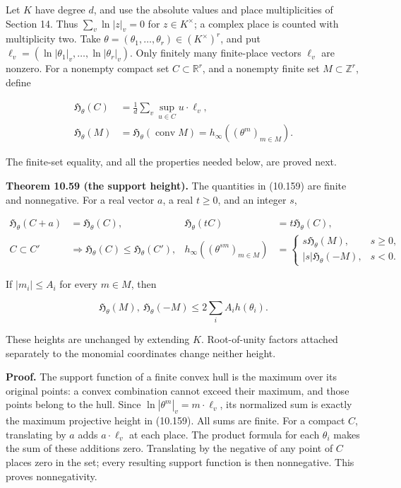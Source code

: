 \documentclass[
  11pt,
  a4paper,
]{article}
\newcounter{none} %
\begin{document}
Let \(K\) have degree \(d\), and use the absolute values and place
multiplicities of Section 14. Thus \(\sum_v\ln|z|_v=0\) for
\(z\in K^\times\); a complex place is counted with multiplicity two.
Take \(\theta=(\theta_1,\ldots,\theta_r)\in(K^\times)^r\), and put
\(\ell_v=(\ln|\theta_1|_v,\ldots,\ln|\theta_r|_v)\). Only finitely many
finite-place vectors \(\ell_v\) are nonzero. For a nonempty compact set
\(C\subset\mathbb R^r\), and a nonempty finite set
\(M\subset\mathbb Z^r\), define

\[
\begin{aligned}
\mathfrak H_\theta(C)&=\frac1d\sum_v\sup_{u\in C}u\cdot\ell_v,\\
\mathfrak H_\theta(M)&=\mathfrak H_\theta(\operatorname{conv}M)
=h_\infty((\theta^m)_{m\in M}).
\end{aligned}
\tag{10.159}
\]

The finite-set equality, and all the properties needed below, are proved
next.

\textbf{Theorem 10.59 (the support height).} The quantities in (10.159)
are finite and nonnegative. For a real vector \(a\), a real \(t\ge0\),
and an integer \(s\),

\[
\begin{aligned}
\mathfrak H_\theta(C+a)&=\mathfrak H_\theta(C),&
\mathfrak H_\theta(tC)&=t\mathfrak H_\theta(C),\\
C\subset C'&\Longrightarrow\mathfrak H_\theta(C)\le\mathfrak H_\theta(C'),&
h_\infty((\theta^{sm})_{m\in M})
&=\begin{cases}
s\mathfrak H_\theta(M),&s\ge0,\\
|s|\mathfrak H_\theta(-M),&s<0.
\end{cases}
\end{aligned}
\tag{10.160}
\]

If \(|m_i|\le A_i\) for every \(m\in M\), then

\[
\mathfrak H_\theta(M),\ \mathfrak H_\theta(-M)
\le2\sum_i A_i h(\theta_i).
\tag{10.161}
\]

These heights are unchanged by extending \(K\). Root-of-unity factors
attached separately to the monomial coordinates change neither height.

\textbf{Proof.} The support function of a finite convex hull is the
maximum over its original points: a convex combination cannot exceed
their maximum, and those points belong to the hull. Since
\(\ln|\theta^m|_v=m\cdot\ell_v\), its normalized sum is exactly the
maximum projective height in (10.159). All sums are finite. For a
compact \(C\), translating by \(a\) adds \(a\cdot\ell_v\) at each place.
The product formula for each \(\theta_i\) makes the sum of these
additions zero. Translating by the negative of any point of \(C\) places
zero in the set; every resulting support function is then nonnegative.
This proves nonnegativity.
\end{document}

